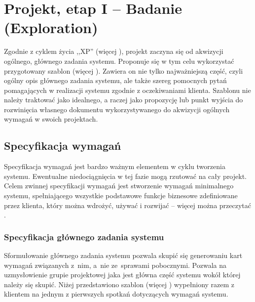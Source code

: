 \chapter{Projekt, etap I -- Badanie (Exploration)}
\label{cha:EtapI}

Zgodnie z cyklem życia ,,XP'' (więcej ), projekt zaczyna się od akwizycji ogólnego, głównego zadania systemu. Proponuje się w tym celu wykorzystać przygotowany szablon (więcej ). Zawiera on nie tylko najważniejszą część, czyli ogólny opis głównego zadania systemu, ale także szereg pomocnych pytań pomagających w realizacji systemu zgodnie z oczekiwaniami klienta. Szablonu nie należy traktować jako idealnego, a raczej jako propozycję lub punkt wyjścia do rozwinięcia własnego dokumentu wykorzystywanego do akwizycji ogólnych wymagań w swoich projektach.

\section{Specyfikacja wymagań}
\label{sec:EtapIsw}

Specyfikacja wymagań jest bardzo ważnym elementem w cyklu tworzenia systemu. Ewentualne niedociągnięcia w tej fazie mogą rzutować na cały projekt. Celem zwinnej specyfikacji wymagań jest stworzenie wymagań minimalnego systemu, spełniającego wszystkie podstawowe funkcje biznesowe zdefiniowane przez klienta, który można wdrożyć, używać i rozwijać -- więcej można przeczytać .

\subsection{Specyfikacja głównego zadania systemu}
\label{sec:EtapIswSGZS}

Sformułowanie głównego zadania systemu pozwala skupić się generowaniu kart wymagań związanych z~nim, a~nie ze~sprawami pobocznymi. Pozwala na uzmysłowienie grupie projektowej jaka jest główna część systemu wokół której należy się skupić. Niżej przedstawiono szablon (więcej ) wypełniony razem z klientem na jednym z pierwszych spotkań dotyczących wymagań systemu. 


